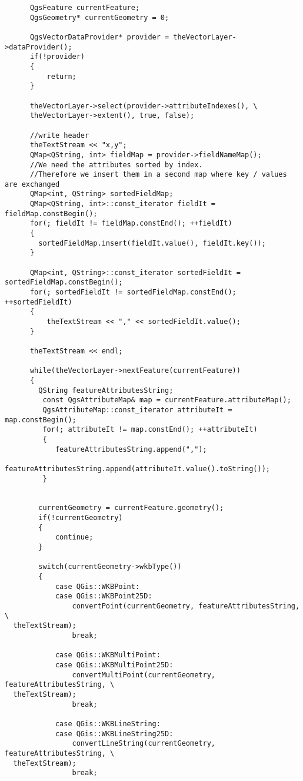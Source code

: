 \begin{verbatim}
      QgsFeature currentFeature;
      QgsGeometry* currentGeometry = 0;

      QgsVectorDataProvider* provider = theVectorLayer->dataProvider();
      if(!provider)
      {
          return;
      }

      theVectorLayer->select(provider->attributeIndexes(), \
      theVectorLayer->extent(), true, false);

      //write header
      theTextStream << "x,y";
      QMap<QString, int> fieldMap = provider->fieldNameMap();
      //We need the attributes sorted by index.
      //Therefore we insert them in a second map where key / values are exchanged
      QMap<int, QString> sortedFieldMap;
      QMap<QString, int>::const_iterator fieldIt = fieldMap.constBegin();
      for(; fieldIt != fieldMap.constEnd(); ++fieldIt)
      {
        sortedFieldMap.insert(fieldIt.value(), fieldIt.key());
      }

      QMap<int, QString>::const_iterator sortedFieldIt = sortedFieldMap.constBegin();
      for(; sortedFieldIt != sortedFieldMap.constEnd(); ++sortedFieldIt)
      {
          theTextStream << "," << sortedFieldIt.value();
      }

      theTextStream << endl;

      while(theVectorLayer->nextFeature(currentFeature))
      {
        QString featureAttributesString;
         const QgsAttributeMap& map = currentFeature.attributeMap();
         QgsAttributeMap::const_iterator attributeIt = map.constBegin();
         for(; attributeIt != map.constEnd(); ++attributeIt)
         {
            featureAttributesString.append(",");
            featureAttributesString.append(attributeIt.value().toString());
         }


        currentGeometry = currentFeature.geometry();
        if(!currentGeometry)
        {
            continue;
        }

        switch(currentGeometry->wkbType())
        {
            case QGis::WKBPoint:
            case QGis::WKBPoint25D:
                convertPoint(currentGeometry, featureAttributesString, \
  theTextStream);
                break;

            case QGis::WKBMultiPoint:
            case QGis::WKBMultiPoint25D:
                convertMultiPoint(currentGeometry, featureAttributesString, \
  theTextStream);
                break;

            case QGis::WKBLineString:
            case QGis::WKBLineString25D:
                convertLineString(currentGeometry, featureAttributesString, \
  theTextStream);
                break;


\end{verbatim}
